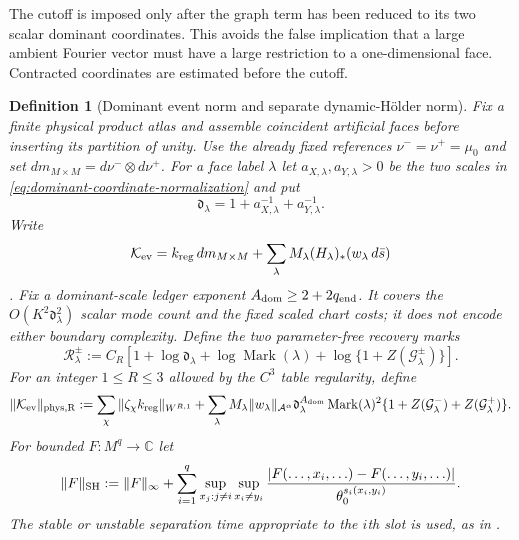 \documentclass[11pt]{article}
\newtheorem{definition}[theorem]{Definition}
\begin{document}
The cutoff is imposed only after the graph term has been reduced to its two
scalar dominant coordinates.  This avoids the false implication that a large
ambient Fourier vector must have a large restriction to a one-dimensional
face.  Contracted coordinates are estimated before the cutoff.

\begin{definition}[Dominant event norm and separate dynamic-H\"older norm]
\label{def:event-current-norm}
Fix a finite physical product atlas and assemble coincident artificial faces
before inserting its partition of unity.  Use the already fixed references
$\nu^-=\nu^+=\mu_0$ and set
$dm_{M\times M}=d\nu^-\otimes d\nu^+$.  For a face label $\lambda$ let
$a_{X,\lambda},a_{Y,\lambda}>0$ be the two scales in
\eqref{eq:dominant-coordinate-normalization} and put
\[
 \mathfrak d_\lambda=1+a_{X,\lambda}^{-1}+a_{Y,\lambda}^{-1}.
\]
Write
\[
 \mathcal K_{\rm ev}=k_{\rm reg}\,dm_{M\times M}
 +\sum_\lambda M_\lambda(H_\lambda)_*(w_\lambda\,d\bar s)
\].
Fix a dominant-scale ledger exponent
$A_{\rm dom}\ge2+2q_{\rm end}$.  It covers the
$O(K^2\mathfrak d_\lambda^2)$ scalar mode count and the fixed scaled chart
costs; it does not encode either boundary complexity.  Define the two
parameter-free recovery marks
\begin{equation}
\label{eq:section-recovery-mark}
 \mathcal R_\lambda^\pm:=C_R\left[1+\log\mathfrak d_\lambda
 +\log\operatorname{Mark}(\lambda)
 +\log\{1+Z(\mathcal G_\lambda^\pm)\}\right].
\end{equation}
For an integer $1\le R\le3$ allowed by the $C^3$ table regularity, define
\begin{equation}
\label{eq:event-physical-norm}
 \|\mathcal K_{\rm ev}\|_{\rm phys,R}:=
 \sum_\chi\|\zeta_\chi k_{\rm reg}\|_{W^{R,1}}
 +\sum_\lambda M_\lambda\|w_\lambda\|_{\mathcal A^\alpha}
 \mathfrak d_\lambda^{A_{\rm dom}}\operatorname{Mark}(\lambda)^2
 \{1+Z(\mathcal G_\lambda^-)+Z(\mathcal G_\lambda^+)\}.
\end{equation}
For bounded $F:M^q\to\mathbb C$ let
\begin{equation}
\label{eq:separate-dynamic-holder-norm}
 \|F\|_{\rm SH}:=\|F\|_\infty+
 \sum_{i=1}^q\sup_{x_j:j\ne i}\sup_{x_i\ne y_i}
 \frac{|F(\ldots,x_i,\ldots)-F(\ldots,y_i,\ldots)|}
      {\theta_0^{s_i(x_i,y_i)}}.
\end{equation}
The stable or unstable separation time appropriate to the $i$th slot is used,
as in \cite[Definition~2.2]{LS}.
\end{definition}
\end{document}
